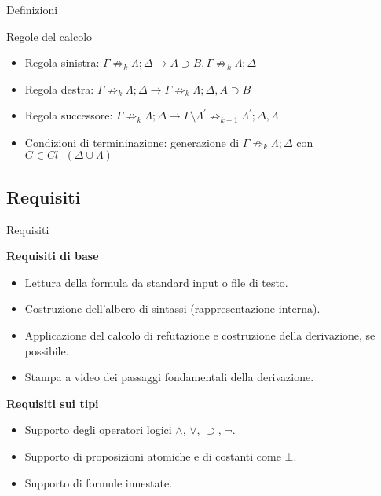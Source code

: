 \documentclass{beamer}
\begin{document}
\begin{darkframes}
    \begin{frame}{Definizioni}
        \begin{block}{Regole del calcolo}
            \begin{itemize}
                \item Regola sinistra: $\Gamma \not\Rightarrow_k \Lambda; \Delta \rightarrow A \supset B, \Gamma \not\Rightarrow_k \Lambda; \Delta$
                \item Regola destra: $\Gamma \not\Rightarrow_k \Lambda; \Delta \rightarrow \Gamma \not\Rightarrow_k \Lambda; \Delta, A \supset B$
                \item Regola successore: $\Gamma \not\Rightarrow_k \Lambda; \Delta \rightarrow \Gamma \setminus \Lambda^{'} \not\Rightarrow_{k+1} \Lambda^{'}; \Delta, \Lambda$
                \item Condizioni di termininazione: generazione di $\Gamma \not\Rightarrow_k \Lambda; \Delta$ con $G \in Cl^-(\Delta \cup \Lambda)$
            \end{itemize}
        \end{block}
    \end{frame}

    \subsection{Requisiti}
    \begin{frame}{Requisiti}

        \textbf{Requisiti di base}
        \begin{itemize}
            \item Lettura della formula da standard input o file di testo.
            \item Costruzione dell'albero di sintassi (rappresentazione interna).
            \item Applicazione del calcolo di refutazione e costruzione della derivazione, se possibile.
            \item Stampa a video dei passaggi fondamentali della derivazione.
        \end{itemize}

        \textbf{Requisiti sui tipi}
        \begin{itemize}
            \item Supporto degli operatori logici $\land$, $\lor$, $\supset$, $\neg$.
            \item Supporto di proposizioni atomiche e di costanti come $\bot$.
            \item Supporto di formule innestate.
        \end{itemize}


\end{frame}
\end{darkframes}
\end{document}
